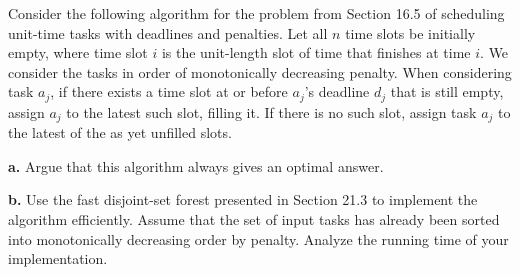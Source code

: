 Consider the following algorithm for the problem from Section 16.5 
of scheduling unit-time tasks with deadlines and penalties. Let all 
$n$ time slots be initially empty, where time slot $i$ is the unit-length 
slot of time that finishes at time $i$. We consider the tasks in order 
of monotonically decreasing penalty. When considering task $a_j$, 
if there exists a time slot at or before $a_j$'s deadline $d_j$ that is still
empty, assign $a_j$ to the latest such slot, filling it. If there is no 
such slot, assign task $a_j$ to the latest of the as yet unfilled slots.

\textbf{a.} Argue that this algorithm always gives an optimal answer.

\textbf{b.} Use the fast disjoint-set forest presented in Section 21.3 to 
implement the algorithm efficiently. Assume that the set of input 
tasks has already been sorted into monotonically decreasing order by 
penalty. Analyze the running time of your implementation.
